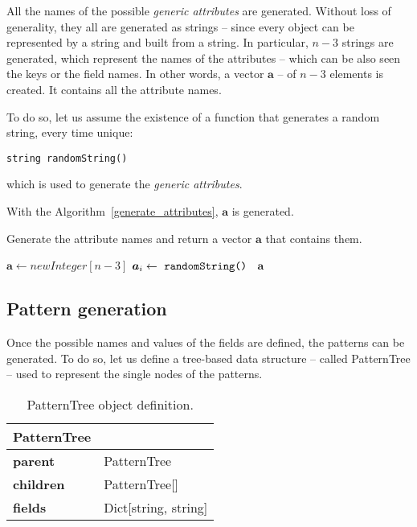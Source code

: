 \documentclass{acm_proc_article-sp-sigmod09}
\begin{document}
All the names of the possible \emph{generic attributes} are generated. Without loss of generality, they all are generated as strings -- since every object can be represented by a string and built from a string. In particular, $n - 3$ strings are generated, which represent the names of the attributes -- which can be also seen the keys or the field names. In other words, a vector $\boldsymbol{a}$ -- of $n - 3$ elements is created. It contains all the attribute names.

To do so, let us assume the existence of a function that generates a random string, every time unique:
\begin{verbatim}
string randomString()
\end{verbatim}
which is used to generate the \emph{generic attributes}.

With the Algorithm~\ref{generate_attributes}, $\boldsymbol{a}$ is generated.
\begin{algorithm}
\caption{Generate the attribute names and return a vector $\boldsymbol{a}$ that contains them.}
\label{generate_attributes}
\begin{algorithmic}[1]
\State $\boldsymbol{a} \gets new Integer[n - 3]$
	\State $\boldsymbol{a}_i \gets \text{ \texttt{randomString() }} $ 
\EndFor
\Return $\boldsymbol{a}$
\EndFunction
\end{algorithmic}
\end{algorithm}

\subsection{Pattern generation}
Once the possible names and values of the fields are defined, the patterns can be generated. To do so, let us define a tree-based data structure -- called PatternTree -- used to represent the single nodes of the patterns.

\begin{table}[H]
\centering
\begin{tabular}{|ll|} \hline
\textbf{PatternTree} & \\ \hline
\textbf{parent} & PatternTree \\ \hline
\textbf{children} & PatternTree[] \\ \hline
\textbf{fields} & Dict[string, string] \\
\hline\end{tabular}
\caption{PatternTree object definition.}
\label{tab:patterntree}
\end{table}
\end{document}
